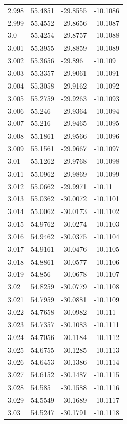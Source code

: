 \begin{tabular}{llll}
2.998 & 55.4851 & -29.8555 & -10.1086 \\
2.999 & 55.4552 & -29.8656 & -10.1087 \\
3.0 & 55.4254 & -29.8757 & -10.1088 \\
3.001 & 55.3955 & -29.8859 & -10.1089 \\
3.002 & 55.3656 & -29.896 & -10.109 \\
3.003 & 55.3357 & -29.9061 & -10.1091 \\
3.004 & 55.3058 & -29.9162 & -10.1092 \\
3.005 & 55.2759 & -29.9263 & -10.1093 \\
3.006 & 55.246 & -29.9364 & -10.1094 \\
3.007 & 55.216 & -29.9465 & -10.1095 \\
3.008 & 55.1861 & -29.9566 & -10.1096 \\
3.009 & 55.1561 & -29.9667 & -10.1097 \\
3.01 & 55.1262 & -29.9768 & -10.1098 \\
3.011 & 55.0962 & -29.9869 & -10.1099 \\
3.012 & 55.0662 & -29.9971 & -10.11 \\
3.013 & 55.0362 & -30.0072 & -10.1101 \\
3.014 & 55.0062 & -30.0173 & -10.1102 \\
3.015 & 54.9762 & -30.0274 & -10.1103 \\
3.016 & 54.9462 & -30.0375 & -10.1104 \\
3.017 & 54.9161 & -30.0476 & -10.1105 \\
3.018 & 54.8861 & -30.0577 & -10.1106 \\
3.019 & 54.856 & -30.0678 & -10.1107 \\
3.02 & 54.8259 & -30.0779 & -10.1108 \\
3.021 & 54.7959 & -30.0881 & -10.1109 \\
3.022 & 54.7658 & -30.0982 & -10.111 \\
3.023 & 54.7357 & -30.1083 & -10.1111 \\
3.024 & 54.7056 & -30.1184 & -10.1112 \\
3.025 & 54.6755 & -30.1285 & -10.1113 \\
3.026 & 54.6453 & -30.1386 & -10.1114 \\
3.027 & 54.6152 & -30.1487 & -10.1115 \\
3.028 & 54.585 & -30.1588 & -10.1116 \\
3.029 & 54.5549 & -30.1689 & -10.1117 \\
3.03 & 54.5247 & -30.1791 & -10.1118 \\

\end{tabular}
